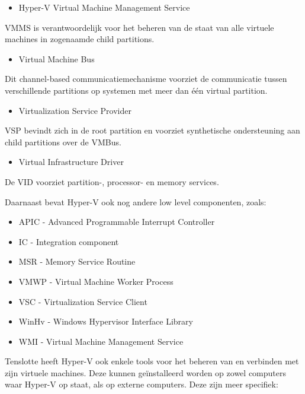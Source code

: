 \begin{itemize}[noitemsep]
	\item Hyper-V Virtual Machine Management Service
\end{itemize}

VMMS is verantwoordelijk voor het beheren van de staat van alle virtuele machines in zogenaamde child partitions.

\begin{itemize}[noitemsep]
	\item Virtual Machine Bus
\end{itemize}

Dit channel-based communicatiemechanisme voorziet de communicatie tussen verschillende partitions op systemen met meer dan één virtual partition.

\begin{itemize}[noitemsep]
	\item Virtualization Service Provider
\end{itemize}

VSP bevindt zich in de root partition en voorziet synthetische ondersteuning aan child partitions over de VMBus.

\begin{itemize}[noitemsep]
	\item Virtual Infrastructure Driver
\end{itemize}

De VID voorziet partition-, processor- en memory services.

Daarnaast bevat Hyper-V ook nog andere low level componenten, zoals:

\begin{itemize}[noitemsep]
	\item APIC - Advanced Programmable Interrupt Controller
	\item IC - Integration component
	\item MSR - Memory Service Routine
	\item VMWP - Virtual Machine Worker Process 
	\item VSC - Virtualization Service Client
	\item WinHv  - Windows Hypervisor Interface Library 
	\item WMI - Virtual Machine Management Service 
\end{itemize}

Tenslotte heeft Hyper-V ook enkele tools voor het beheren van en verbinden met zijn virtuele machines. Deze kunnen geïnstalleerd worden op zowel computers waar Hyper-V op staat, als op externe computers. Deze zijn meer specifiek:

